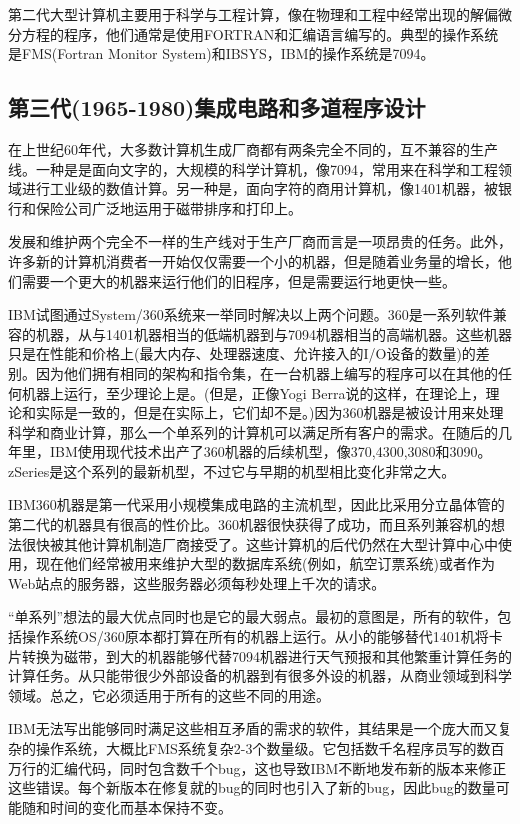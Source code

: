	第二代大型计算机主要用于科学与工程计算，像在物理和工程中经常出现的解偏微分方程的程序，他们通常是使用FORTRAN和汇编语言编写的。典型的操作系统是FMS(Fortran Monitor System)和IBSYS，IBM的操作系统是7094。
	
\subsection{第三代(1965-1980)集成电路和多道程序设计}

	在上世纪60年代，大多数计算机生成厂商都有两条完全不同的，互不兼容的生产线。一种是是面向文字的，大规模的科学计算机，像7094，常用来在科学和工程领域进行工业级的数值计算。另一种是，面向字符的商用计算机，像1401机器，被银行和保险公司广泛地运用于磁带排序和打印上。
	
	发展和维护两个完全不一样的生产线对于生产厂商而言是一项昂贵的任务。此外，许多新的计算机消费者一开始仅仅需要一个小的机器，但是随着业务量的增长，他们需要一个更大的机器来运行他们的旧程序，但是需要运行地更快一些。
	
	IBM试图通过System/360系统来一举同时解决以上两个问题。360是一系列软件兼容的机器，从与1401机器相当的低端机器到与7094机器相当的高端机器。这些机器只是在性能和价格上(最大内存、处理器速度、允许接入的I/O设备的数量)的差别。因为他们拥有相同的架构和指令集，在一台机器上编写的程序可以在其他的任何机器上运行，至少理论上是。(但是，正像Yogi Berra说的这样，在理论上，理论和实际是一致的，但是在实际上，它们却不是。)因为360机器是被设计用来处理科学和商业计算，那么一个单系列的计算机可以满足所有客户的需求。在随后的几年里，IBM使用现代技术出产了360机器的后续机型，像370,4300,3080和3090。zSeries是这个系列的最新机型，不过它与早期的机型相比变化非常之大。
	
	IBM360机器是第一代采用小规模集成电路的主流机型，因此比采用分立晶体管的第二代的机器具有很高的性价比。360机器很快获得了成功，而且系列兼容机的想法很快被其他计算机制造厂商接受了。这些计算机的后代仍然在大型计算中心中使用，现在他们经常被用来维护大型的数据库系统(例如，航空订票系统)或者作为Web站点的服务器，这些服务器必须每秒处理上千次的请求。
	
	“单系列”想法的最大优点同时也是它的最大弱点。最初的意图是，所有的软件，包括操作系统OS/360原本都打算在所有的机器上运行。从小的能够替代1401机将卡片转换为磁带，到大的机器能够代替7094机器进行天气预报和其他繁重计算任务的计算任务。从只能带很少外部设备的机器到有很多外设的机器，从商业领域到科学领域。总之，它必须适用于所有的这些不同的用途。
	
	IBM无法写出能够同时满足这些相互矛盾的需求的软件，其结果是一个庞大而又复杂的操作系统，大概比FMS系统复杂2-3个数量级。它包括数千名程序员写的数百万行的汇编代码，同时包含数千个bug，这也导致IBM不断地发布新的版本来修正这些错误。每个新版本在修复就的bug的同时也引入了新的bug，因此bug的数量可能随和时间的变化而基本保持不变。
	
